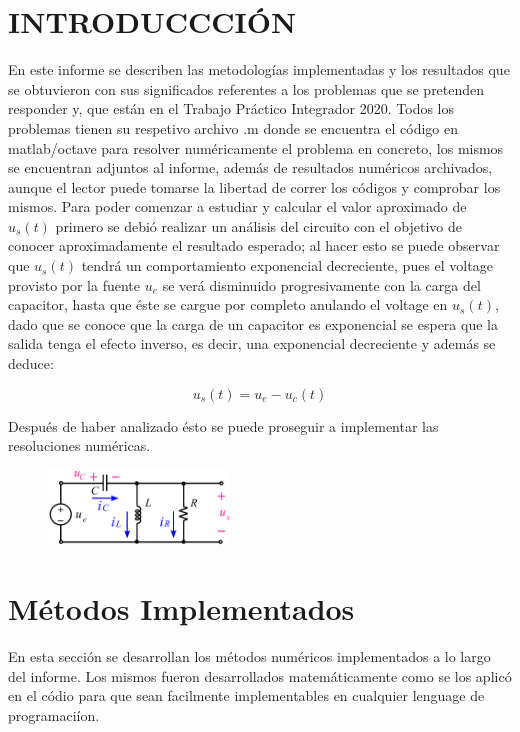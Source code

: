 \documentclass[letterpaper, 10 pt, conference]{ieeeconf}  %
\begin{document}
\section{INTRODUCCCI\'ON}

    En este informe se describen las metodolog\'ias implementadas y los resultados que se obtuvieron con sus significados referentes a los problemas que se pretenden responder y, que est\'an en el Trabajo Pr\'actico Integrador 2020.
    Todos los problemas tienen su respetivo archivo .m donde se encuentra el c\'odigo en matlab/octave para resolver num\'ericamente el problema en concreto, los mismos se encuentran adjuntos al informe, adem\'as de resultados num\'ericos archivados, aunque el lector puede tomarse la libertad de correr los c\'odigos y comprobar los mismos.
    Para poder comenzar a estudiar y calcular el valor aproximado de $u_{s}(t)$ primero se debi\'o realizar un an\'alisis del circuito con el objetivo de conocer aproximadamente el resultado esperado; al hacer esto se puede observar que $u_{s}(t)$ tendr\'a un comportamiento exponencial decreciente, pues el voltage provisto por la fuente $u_{e}$ se ver\'a disminuido progresivamente con la carga del capacitor, hasta que \'este se cargue por completo anulando el voltage en $u_{s}(t)$, dado que se conoce que la carga de un capacitor es exponencial se espera que la salida tenga el efecto inverso, es decir, una exponencial decreciente y adem\'as se deduce:

    \[ u_{s}(t) = u_{e} - u_{c}(t) \]

    Despu\'es de haber analizado \'esto se puede proseguir a implementar las resoluciones num\'ericas.

    \begin{figure}[H]
    \centering
    \includegraphics[width=0.43\textwidth]{./circuito.jpg}
    \caption{}
    \label{fig:fig}
    \end{figure}

\section{M\'etodos Implementados}

    En esta secci\'on se desarrollan los m\'etodos num\'ericos implementados a lo largo del informe. Los mismos fueron desarrollados matem\'aticamente como se los aplic\'o en el c\'odio para que sean facilmente implementables en cualquier lenguage de programaci\'ion.
\end{document}
